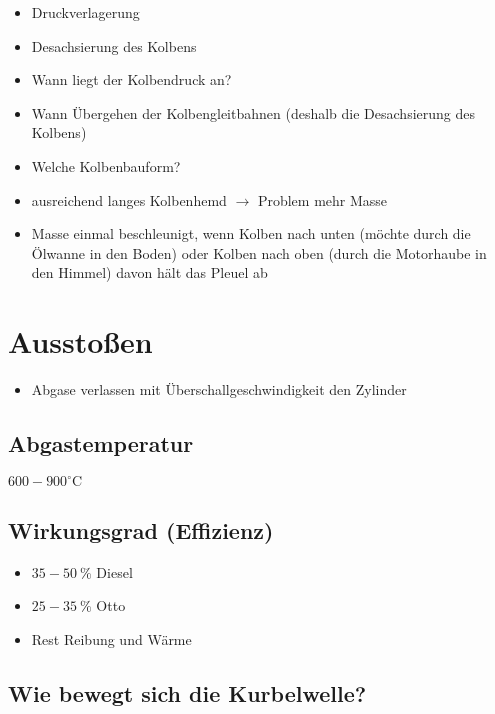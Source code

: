 \begin{itemize}
\item
  Druckverlagerung
\item
  Desachsierung des Kolbens
\item
  Wann liegt der Kolbendruck an?
\item
  Wann Übergehen der Kolbengleitbahnen (deshalb die Desachsierung des
  Kolbens)
\item
  Welche Kolbenbauform?
\item
  ausreichend langes Kolbenhemd $\to$ Problem mehr Masse
\item
  Masse einmal beschleunigt, wenn Kolben nach unten (möchte durch die
  Ölwanne in den Boden) oder Kolben nach oben (durch die Motorhaube in
  den Himmel) davon hält das Pleuel ab
\end{itemize}

\section{Ausstoßen}\label{ausstossen}

\begin{itemize}
\item
  Abgase verlassen mit Überschallgeschwindigkeit den Zylinder
\end{itemize}

\subsection{Abgastemperatur}\label{abgastemperatur}

$600 - 900^\circ\text{C}$

\subsection{Wirkungsgrad (Effizienz)}\label{wirkungsgrad-effizienz}

\begin{itemize}
\item
  $35 - 50~\%$ Diesel
\item
  $25 - 35~\%$ Otto
\item
  Rest Reibung und Wärme
\end{itemize}

\subsection{Wie bewegt sich die
Kurbelwelle?}\label{wie-bewegt-sich-die-kurbelwelle}

